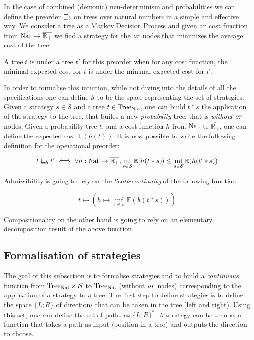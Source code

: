 In the case of combined (demonic) non-determinism and probabilities we can define 
the preorder $\sqsubseteq_b$ on trees over natural numbers in a simple and
effective way. We consider a tree as a Markov Decision Process 
and given an cost function from $\textnormal{Nat} \to \overline{\mathbb{R}_+}$
we find a strategy for the $\operatorname{\mathit{or}}$ nodes that minimizes the average
cost of the tree. 

A tree $t$ is under a tree $t'$ for this preorder when for any 
cost function, the minimal expected cost for $t$ is under the 
minimal expected cost for $t'$.

In order to formalise this intuition, while not diving into the details of 
all the specifications one can 
define $\mathcal{S}$ to be the space representing 
the set of strategies. Given a strategy $s \in \mathcal{S}$ and 
a tree $t \in \textnormal{Tree}_{\textnormal{Nat}}$, one can build $t*s$ the application of 
the strategy to the tree, that builds a new \emph{probability} tree, that 
is \emph{without} $\operatorname{\mathit{or}}$ nodes. Given a probability tree $t$, and a 
cost function $h$ from $\textnormal{Nat}$ to $\overline{\mathbb{R}_+}$, one can define the expected cost $\mathbb{E} (h(t))$.
It is now possible to write the following definition for the operational 
preorder:

\begin{equation*}
    t \sqsubseteq_b t' \iff 
    \forall h : \textnormal{Nat} \to \overline{\mathbb{R}_+}, 
    \inf_{s \in \mathcal{S}} \mathbb{E}(h(t*s)) \leq 
    \inf_{s \in \mathcal{S}} \mathbb{E}(h(t'*s))
\end{equation*}

Admissibility is going to rely on the \emph{Scott-continuity} 
of the following function:

\begin{equation*}
    t \mapsto \left(h \mapsto \inf_{s \in \mathcal{S}} \mathbb{E} (h
(t*s))\right)
\end{equation*}

Compositionality on the other hand is going to rely on an elementary 
decomposition result of the above function.

\subsection{Formalisation of strategies} 

The goal of this subsection is to formalise strategies and 
to build a \emph{continuous} function from $\textnormal{Tree}_{\textnormal{Nat}} \times \mathcal{S}$
to $\textnormal{Tree}_{\textnormal{Nat}}$ (without $\operatorname{\mathit{or}}$ nodes) corresponding to the 
application of a strategy to a tree.
The first step to define strategies is to define the space 
$\{ L; R\}$ of directions that can be taken in the tree (left and right).
Using this set, one can define the set of paths as $\{ L; R \}^*$. A 
strategy can be seen as a function that takes a path as input (position 
in a tree) and outputs the direction to choose.

